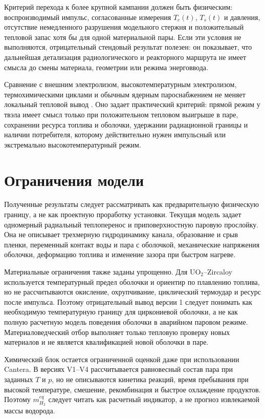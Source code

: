 \documentclass[12pt]{article}
\begin{document}
Критерий перехода к более крупной кампании должен быть физическим: воспроизводимый импульс, согласованные измерения \(T_c(t)\), \(T_s(t)\) и давления, отсутствие немедленного разрушения модельного стержня и положительный тепловой запас хотя бы для одной материальной пары. Если эти условия не выполняются, отрицательный стендовый результат полезен: он показывает, что дальнейшая детализация радиологического и реакторного маршрута не имеет смысла до смены материала, геометрии или режима энерговвода.

Сравнение с внешним электролизом, высокотемпературным электролизом, термохимическими циклами и обычным ядерным пароснабжением не меняет локальный тепловой вывод \cite{DOEHighTempElectrolysis,DOEThermochemicalWaterSplitting,NEAHighTempGasReactors2022}. Оно задает практический критерий: прямой режим у твэла имеет смысл только при положительном тепловом выигрыше в паре, сохранении ресурса топлива и оболочки, удержании радиационной границы и наличии потребителя, которому действительно нужен импульсный или экстремально высокотемпературный режим.

\section{Ограничения модели}

Полученные результаты следует рассматривать как предварительную физическую границу, а не как проектную проработку установки. Текущая модель задает одномерный радиальный теплоперенос и приповерхностную паровую прослойку. Она не описывает трехмерную гидродинамику канала, образование и срыв пленки, переменный контакт воды и пара с оболочкой, механические напряжения оболочки, деформацию топлива и изменение зазора при быстром нагреве.

Материальные ограничения также заданы упрощенно. Для \(\mathrm{UO_2}\)--Zircaloy используется температурный предел оболочки и ориентир по плавлению топлива, но не рассчитываются окисление, охрупчивание, циклический термоудар и ресурс после импульса. Поэтому отрицательный вывод версии 1 следует понимать как необходимую температурную границу для циркониевой оболочки, а не как полную расчетную модель поведения оболочки в аварийном паровом режиме. Материаловедческий отбор выполняет только тепловую проверку новых материалов и не является квалификацией новой оболочки в паре.

Химический блок остается ограниченной оценкой даже при использовании Cantera. В версиях V1--V4 рассчитывается равновесный состав пара при заданных \(T\) и \(p\), но не описываются кинетика реакций, время пребывания при высокой температуре, смешение, рекомбинация и быстрое охлаждение продуктов. Поэтому \(m_{H_2}^{eq}\) следует читать как расчетный индикатор, а не прогноз извлекаемой массы водорода.
\end{document}
